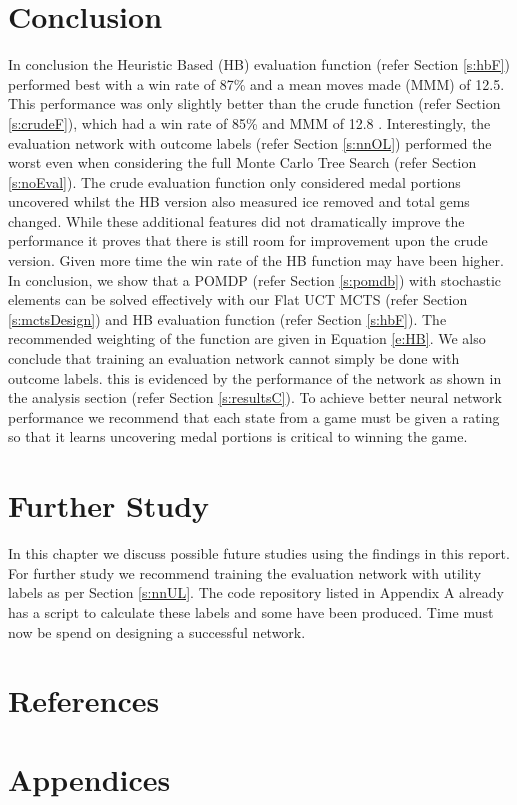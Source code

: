 \documentclass{bhamthesis}
\theoremstyle{definition}
\begin{document}
\chapter{Conclusion}
In conclusion the Heuristic Based (HB) evaluation function (refer Section \ref{s:hbF}) performed best with a win rate of 87\% and a mean moves made (MMM) of 12.5. This performance was only slightly better than the crude function (refer Section \ref{s:crudeF}), which had a win rate of 85\% and MMM of 12.8 . Interestingly, the evaluation network with outcome labels (refer Section \ref{s:nnOL}) performed the worst even when considering the full Monte Carlo Tree Search (refer Section \ref{s:noEval}).
The crude evaluation function only considered medal portions uncovered whilst the HB version also measured ice removed and total gems changed. While these additional features did not dramatically improve the performance it proves that there is still room for improvement upon the crude version. Given more time the win rate of the HB function may have been higher. 
In conclusion, we show that a POMDP (refer Section \ref{s:pomdb}) with stochastic elements can be solved effectively with our Flat UCT MCTS (refer Section \ref{s:mctsDesign}) and HB evaluation function (refer Section \ref{s:hbF}). The recommended weighting of the function are given in Equation \ref{e:HB}. We also conclude that training an evaluation network cannot simply be done with outcome labels. this is evidenced by the performance of the network as shown in the analysis section (refer Section \ref{s:resultsC}). To achieve better neural network performance we recommend that each state from a game must be given a rating so that it learns uncovering medal portions is critical to winning the game.

\chapter{Further Study}
In this chapter we discuss possible future studies using the findings in this report. 
For further study we recommend training the evaluation network with utility labels as per Section \ref{s:nnUL}. The code repository listed in Appendix A already has a script to calculate these labels and some have been produced. Time must now be spend on designing a successful network.


\backmatter
\chapter{References}
\printbibliography[heading=none]
%
%

\chapter{Appendices}
\end{document}
